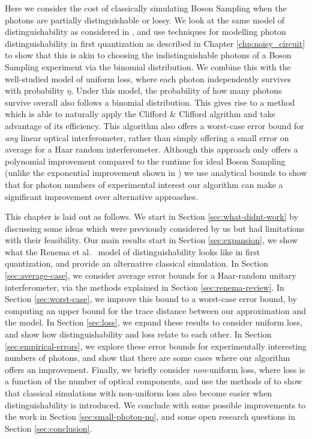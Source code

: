 Here we consider the cost of classically simulating Boson Sampling when the photons are partially distinguishable or lossy.
We look at the same model of distinguishability as considered in \cite{renema2018,renema2018loss}, and use techniques for modelling photon distinguishability in first quantization as described in Chapter \ref{chp:noisy_circuit} to show that this is akin to choosing the indistinguishable photons of a Boson Sampling experiment via the binomial distribution. 
We combine this with the well-studied model of uniform loss, where each photon independently survives with probability $\eta$. Under this model, the probability of how many photons survive overall also follows a binomial distribution. 
This gives rise to a method which is able to naturally apply the Clifford \& Clifford algrithm and take advantage of its efficiency. This algorithm also offers a worst-case error bound for \textit{any} linear optical interferometer, rather than simply offering a small error on average for a Haar random interferometer.
Although this approach only offers a polynomial improvement compared to the runtime for ideal Boson Sampling (unlike the exponential improvement shown in \cite{renema2018,renema2018loss}) we use analytical bounds to show that for photon numbers of experimental interest our algorithm can make a significant improvement over alternative approaches.

This chapter is laid out as follows.
We start in Section \ref{sec:what-didnt-work} by discussing some ideas which were previously considered by us but had limitations with their feasibility.
Our main results start in Section \ref{sec:expansion}, we show what the Renema et al.~\cite{renema2018, renema2018loss} model of distinguishability looks like in first quantization, and provide an alternative classical simulation. 
In Section \ref{sec:average-case}, we consider average error bounds for a Haar-random unitary interferometer, via the methods explained in Section \ref{sec:renema-review}. 
In Section \ref{sec:worst-case}, we improve this bound to a worst-case error bound, by computing an upper bound for the trace distance between our approximation and the model. 
In Section \ref{sec:loss}, we expand these results to consider uniform loss, and show how distinguishability and loss relate to each other. 
In Section \ref{sec:empirical-errors}, we explore these error bounds for experimentally interesting numbers of photons, and show that there are some cases where our algorithm offers an improvement. 
Finally, we briefly consider \emph{non}-uniform loss, where loss is a function of the number of optical components, and use the methods of \cite{garciapatron2017, oszmaniec2018} to show that classical simulations with non-uniform loss also become easier when distinguishability is introduced.
We conclude with some possible improvements to the work in Section \ref{sec:small-photon-no}, and some open research questions in Section \ref{sec:conclusion}.

